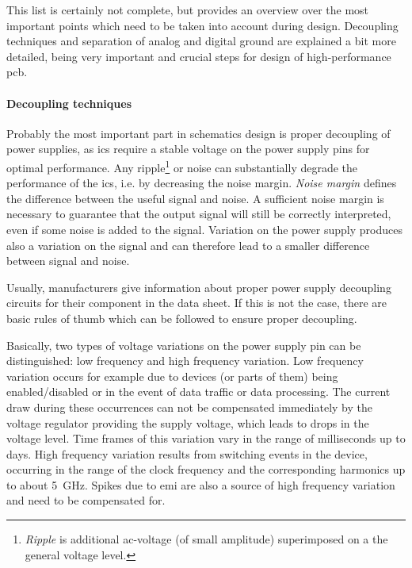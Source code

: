 This list is certainly not complete, but provides an overview over the most important points which need to be taken into account during design.
Decoupling techniques and separation of analog and digital ground are explained a bit more detailed, being very important and crucial steps for design of high-performance \gls{pcb}.
 
\paragraph{Decoupling techniques}
Probably the most important part in schematics design is proper decoupling of power supplies, as \glspl{ic} require a stable voltage on the power supply pins for optimal performance.
Any ripple\footnote{\textit{Ripple} is additional \gls{ac}-voltage (of small amplitude) superimposed on a the general voltage level.} or noise can substantially degrade the performance of the \glspl{ic}, i.e. by decreasing the noise margin.
\textit{Noise margin} defines the difference between the useful signal and noise. 
A sufficient noise margin is necessary to guarantee that the output signal will still be correctly interpreted, even if some noise is added to the signal.
Variation on the power supply produces also a variation on the signal and can therefore lead to a smaller difference between signal and noise.

Usually, manufacturers give information about proper power supply decoupling circuits for their component in the data sheet.
If this is not the case, there are basic rules of thumb which can be followed to ensure proper decoupling. \cite{decouple}

Basically, two types of voltage variations on the power supply pin can be distinguished: low frequency and high frequency variation.
Low frequency variation occurs for example due to devices (or parts of them) being enabled/disabled or in the event of data traffic or data processing.
The current draw during these occurrences can not be compensated immediately by the voltage regulator providing the supply voltage, which leads to drops in the voltage level.
Time frames of this variation vary in the range of milliseconds up to days.
High frequency variation results from switching events in the device, occurring in the range of the clock frequency and the corresponding harmonics up to about \SI{5}{\giga \hertz}.
Spikes due to \gls{emi} are also a source of high frequency variation and need to be compensated for. \cite{xilDecouple} 

